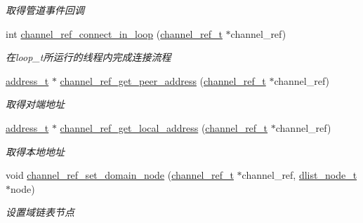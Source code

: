 \begin{DoxyCompactItemize}
\begin{DoxyCompactList}\small\item\em 取得管道事件回调 \end{DoxyCompactList}\item 
int \hyperlink{a00047_af748fb7631166d41826187a22ef28cc4_af748fb7631166d41826187a22ef28cc4}{channel\+\_\+ref\+\_\+connect\+\_\+in\+\_\+loop} (\hyperlink{a00050_a151271c9d188ef28d4d24bb81dcc1263_a151271c9d188ef28d4d24bb81dcc1263}{channel\+\_\+ref\+\_\+t} $\ast$channel\+\_\+ref)
\begin{DoxyCompactList}\small\item\em 在loop\+\_\+t所运行的线程内完成连接流程 \end{DoxyCompactList}\item 
\hyperlink{a00050_a7a6e75b85c8b441f843bd40004a7d9d5_a7a6e75b85c8b441f843bd40004a7d9d5}{address\+\_\+t} $\ast$ \hyperlink{a00101_ga7bcafd2461a1edfde9c581cb946dcd44_ga7bcafd2461a1edfde9c581cb946dcd44}{channel\+\_\+ref\+\_\+get\+\_\+peer\+\_\+address} (\hyperlink{a00050_a151271c9d188ef28d4d24bb81dcc1263_a151271c9d188ef28d4d24bb81dcc1263}{channel\+\_\+ref\+\_\+t} $\ast$channel\+\_\+ref)
\begin{DoxyCompactList}\small\item\em 取得对端地址 \end{DoxyCompactList}\item 
\hyperlink{a00050_a7a6e75b85c8b441f843bd40004a7d9d5_a7a6e75b85c8b441f843bd40004a7d9d5}{address\+\_\+t} $\ast$ \hyperlink{a00101_ga1dcf6af0c992fa21f9dcd03c8f763ec4_ga1dcf6af0c992fa21f9dcd03c8f763ec4}{channel\+\_\+ref\+\_\+get\+\_\+local\+\_\+address} (\hyperlink{a00050_a151271c9d188ef28d4d24bb81dcc1263_a151271c9d188ef28d4d24bb81dcc1263}{channel\+\_\+ref\+\_\+t} $\ast$channel\+\_\+ref)
\begin{DoxyCompactList}\small\item\em 取得本地地址 \end{DoxyCompactList}\item 
void \hyperlink{a00047_a31d88025a8c93858b7784ce1f89cfffe_a31d88025a8c93858b7784ce1f89cfffe}{channel\+\_\+ref\+\_\+set\+\_\+domain\+\_\+node} (\hyperlink{a00050_a151271c9d188ef28d4d24bb81dcc1263_a151271c9d188ef28d4d24bb81dcc1263}{channel\+\_\+ref\+\_\+t} $\ast$channel\+\_\+ref, \hyperlink{a00050_a62053232bcf3566010ef98a7d77c3cc8_a62053232bcf3566010ef98a7d77c3cc8}{dlist\+\_\+node\+\_\+t} $\ast$node)
\begin{DoxyCompactList}\small\item\em 设置域链表节点 \end{DoxyCompactList}\item 

\end{DoxyCompactItemize}
